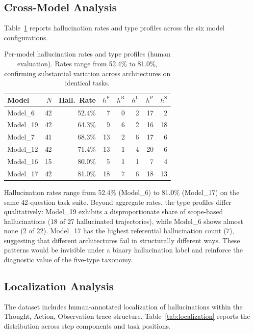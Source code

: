 \documentclass{article}
\begin{document}
\subsection{Cross-Model Analysis}
\label{app:cross_model}

Table~\ref{tab:per_model} reports hallucination rates and type profiles across the six model configurations.

\begin{table}[t]
\caption{Per-model hallucination rates and type profiles (human evaluation). Rates range from 52.4\% to 81.0\%, confirming substantial variation across architectures on identical tasks.}
\label{tab:per_model}
\centering
\small
\begin{tabular}{lrrrrrrr}
\toprule
\textbf{Model} & $N$ & \textbf{Hall.\ Rate} & $h^{\text{F}}$ & $h^{\text{R}}$ & $h^{\text{L}}$ & $h^{\text{P}}$ & $h^{\text{S}}$ \\
\midrule
Model\_6  & 42 & 52.4\% & 7  & 0 & 2  & 17 & 2  \\
Model\_19 & 42 & 64.3\% & 9  & 6 & 2  & 16 & 18 \\
Model\_7  & 41 & 68.3\% & 13 & 2 & 6  & 17 & 6  \\
Model\_12 & 42 & 71.4\% & 13 & 1 & 4  & 20 & 6  \\
Model\_16 & 15 & 80.0\% & 5  & 1 & 1  & 7  & 4  \\
Model\_17 & 42 & 81.0\% & 18 & 7 & 6  & 18 & 13 \\
\bottomrule
\end{tabular}
\end{table}

Hallucination rates range from 52.4\% (Model\_6) to 81.0\% (Model\_17) on the same 42-question task suite. Beyond aggregate rates, the type profiles differ qualitatively: Model\_19 exhibits a disproportionate share of scope-based hallucinations (18 of 27 hallucinated trajectories), while Model\_6 shows almost none (2 of 22). Model\_17 has the highest referential hallucination count (7), suggesting that different architectures fail in structurally different ways. These patterns would be invisible under a binary hallucination label and reinforce the diagnostic value of the five-type taxonomy.

\subsection{Localization Analysis}
\label{app:localization}

The dataset includes human-annotated localization of hallucinations within the Thought, Action, Observation trace structure. Table~\ref{tab:localization} reports the distribution across step components and task positions.
\end{document}
